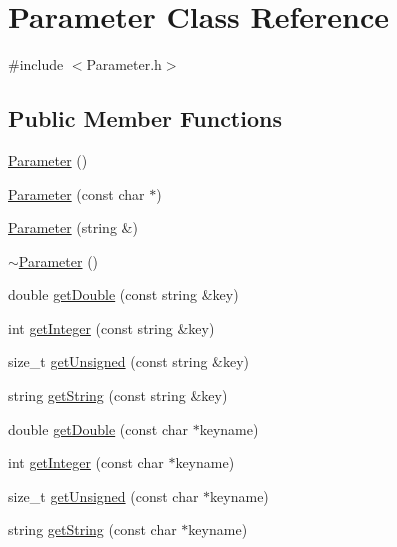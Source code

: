 \hypertarget{classParameter}{
\section{Parameter Class Reference}
\label{dc/dab/classParameter}
}


{\ttfamily \#include $<$Parameter.h$>$}

\subsection*{Public Member Functions}
\begin{DoxyCompactItemize}
\item 
\hyperlink{classParameter_a722d0b273a6e3633c189fb21eaaa483c}{Parameter} ()
\item 
\hyperlink{classParameter_a1efab2581cb1f52909ddbfce673e2676}{Parameter} (const char $\ast$)
\item 
\hyperlink{classParameter_a16a0e276685a4534539ceeecfff4a973}{Parameter} (string \&)
\item 
\hyperlink{classParameter_a615c436bf6b0250e3518ba91a5d88f66}{$\sim$Parameter} ()
\item 
double \hyperlink{classParameter_a0c16acb1070d619c3623eb3a189ad28a}{getDouble} (const string \&key)
\item 
int \hyperlink{classParameter_ac824ab9e6f3bdc40c06a51104042606d}{getInteger} (const string \&key)
\item 
size\_\-t \hyperlink{classParameter_a9ca5d85ae95f7de8c54a8dab6ce3b23b}{getUnsigned} (const string \&key)
\item 
string \hyperlink{classParameter_a045d1952f2ca9b389c09c7b5db9afeb9}{getString} (const string \&key)
\item 
double \hyperlink{classParameter_abb350b82b0de532c30b9c941d0991eb7}{getDouble} (const char $\ast$keyname)
\item 
int \hyperlink{classParameter_a4c8228938f9fad6fd3140ff7981bc744}{getInteger} (const char $\ast$keyname)
\item 
size\_\-t \hyperlink{classParameter_ac391cc54cc7d4ca88917e1e8d6df456c}{getUnsigned} (const char $\ast$keyname)
\item 
string \hyperlink{classParameter_a0bd21e5a7ff019cef6fe1605840c331d}{getString} (const char $\ast$keyname)
\end{DoxyCompactItemize}


